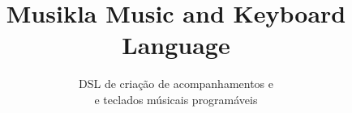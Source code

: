 \documentclass[
  docdegree=msc,        %
  school=um/eeng,      %
  lang=en,              %
  fontstyle=newsgott,    %
  chapstyle=elegant,    %
  otherlistsat=front,   %
  secondcover=true,     %
  aftercover=false,     %
  linkscolor=darkblue,  %
  printcommittee=false,  %
  spine=false,          %
  cdcover=false,         %
  biblatex={            %
    backend=bibtex,     %
    style=numeric-comp, %
    sortcites=true,     %
    sorting=nyt,        %
    maxbibnames=99,     %
    giveninits=true,    %
    hyperref=true       %
  },
  memoir={              %
    a4paper,            %
    12pt,               %
    final,              %
    oneside
  },
  media=screen,         %
  oneside
]{novathesis}
\title[Musikla\\Music and Keyboard Language]{Musikla Music and Keyboard Language}
\subtitle{DSL de criação de acompanhamentos e\\e teclados músicais programáveis}
\begin{document}
\printcoverpage    %
\thesisfrontmatter  %
\printaftercover
\printcopyright    %
\printstatementofintegrity
\printdedicatory  %
\printacknowledgements  %
\printquote        %
\printabstract    %
\printtoc         %
\printotherlists   %


\thesismainmatter  %
\printchapthers    %
\printbib    %
\printotherlists   %
\printappendixes  %
\printannexes  %
\printbackcoverpage
\end{document}
